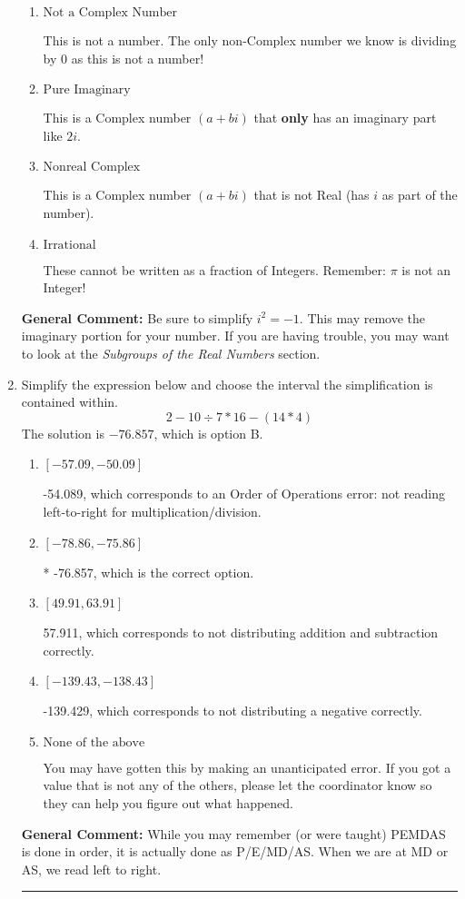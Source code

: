 \documentclass{extbook}[14pt]
\newcommand{\litem}[1]{\item #1

\rule{\textwidth}{0.4pt}}
\begin{document}
\begin{enumerate}
{\begin{enumerate}[label=\Alph*.]
* This is the correct option!
\item \( \text{Not a Complex Number} \)

This is not a number. The only non-Complex number we know is dividing by 0 as this is not a number!
\item \( \text{Pure Imaginary} \)

This is a Complex number $(a+bi)$ that \textbf{only} has an imaginary part like $2i$.
\item \( \text{Nonreal Complex} \)

This is a Complex number $(a+bi)$ that is not Real (has $i$ as part of the number).
\item \( \text{Irrational} \)

These cannot be written as a fraction of Integers. Remember: $\pi$ is not an Integer!
\end{enumerate}

\textbf{General Comment:} Be sure to simplify $i^2 = -1$. This may remove the imaginary portion for your number. If you are having trouble, you may want to look at the \textit{Subgroups of the Real Numbers} section.
}
\litem{
Simplify the expression below and choose the interval the simplification is contained within.
\[ 2 - 10 \div 7 * 16 - (14 * 4) \]The solution is \( -76.857 \), which is option B.\begin{enumerate}[label=\Alph*.]
\item \( [-57.09, -50.09] \)

 -54.089, which corresponds to an Order of Operations error: not reading left-to-right for multiplication/division.
\item \( [-78.86, -75.86] \)

* -76.857, which is the correct option.
\item \( [49.91, 63.91] \)

 57.911, which corresponds to not distributing addition and subtraction correctly.
\item \( [-139.43, -138.43] \)

 -139.429, which corresponds to not distributing a negative correctly.
\item \( \text{None of the above} \)

 You may have gotten this by making an unanticipated error. If you got a value that is not any of the others, please let the coordinator know so they can help you figure out what happened.
\end{enumerate}

\textbf{General Comment:} While you may remember (or were taught) PEMDAS is done in order, it is actually done as P/E/MD/AS. When we are at MD or AS, we read left to right.
}
\end{enumerate}
\end{document}
